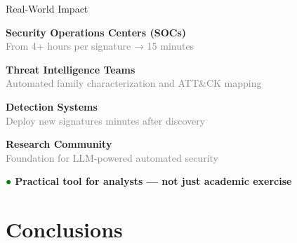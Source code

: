 \documentclass[11pt,aspectratio=16:9]{beamer}
\begin{document}
\begin{frame}{Real-World Impact}
  \vspace{0.5cm}
  \begin{tcolorbox}[colback=accent1!10, colframe=accent1, boxrule=2pt]
    \centering \textbf{Security Operations Centers (SOCs)}\\
    {\small \textcolor{gray}{From 4+ hours per signature → 15 minutes}}
  \end{tcolorbox}
  
  \vspace{0.4cm}
  \begin{tcolorbox}[colback=accent2!10, colframe=accent2, boxrule=2pt]
    \centering \textbf{Threat Intelligence Teams}\\
    {\small \textcolor{gray}{Automated family characterization and ATT\&CK mapping}}
  \end{tcolorbox}
  
  \vspace{0.4cm}
  \begin{tcolorbox}[colback=accent3!10, colframe=accent3, boxrule=2pt]
    \centering \textbf{Detection Systems}\\
    {\small \textcolor{gray}{Deploy new signatures minutes after discovery}}
  \end{tcolorbox}
  
  \vspace{0.4cm}
  \begin{tcolorbox}[colback=orange!10, colframe=orange, boxrule=2pt]
    \centering \textbf{Research Community}\\
    {\small \textcolor{gray}{Foundation for LLM-powered automated security}}
  \end{tcolorbox}
  
  \vspace{0.6cm}
  \begin{tcolorbox}[colback=green!5, colframe=green, boxrule=3pt, arc=8pt]
    \centering \Large \textbf{\textcolor{green}{●}} \textbf{Practical tool for analysts — not just academic exercise}
  \end{tcolorbox}
\end{frame}

\section{Conclusions}
\end{document}
